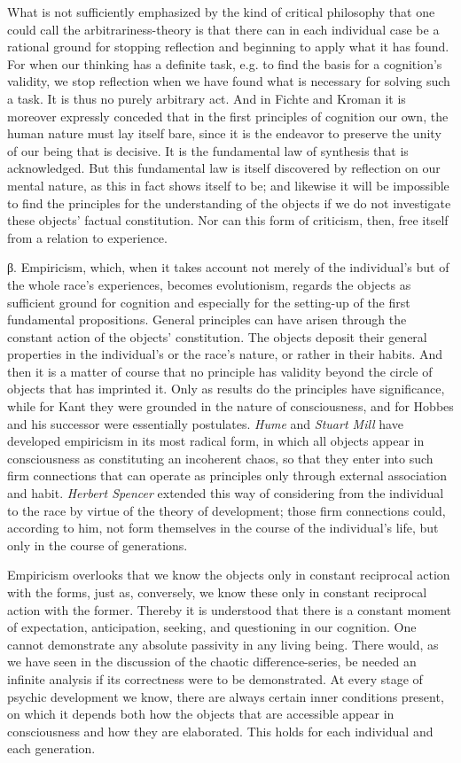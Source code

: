 \documentclass[12pt,a4paper]{book}
\newcommand{\opage}[1]{\marginnote{\footnotesize\textit{[#1]}}}
\begin{document}
What is not sufficiently emphasized by the kind of critical philosophy that one
could call the arbitrariness-theory is that there can in each individual case
be a rational ground for stopping reflection and beginning to apply what it has
found. For when our thinking has a definite task, e.g. to find the basis for a
cognition's validity, we stop reflection when we have found what is necessary
for solving such a task. It is thus no purely arbitrary act. And in Fichte and
Kroman it is moreover expressly conceded that in the first principles of
cognition our own, the human nature must lay itself bare, since it is the
endeavor to preserve the unity of our being that is decisive. It is the
fundamental law of synthesis that is acknowledged. But this fundamental law is
itself discovered by reflection on our mental nature, as this in fact shows
itself to be; and likewise it will be impossible to find the principles for the
understanding of the objects if we do not investigate these objects' \opage{269}factual
constitution. Nor can this form of criticism, then, free itself from a relation
to experience.

β. Empiricism, which, when it takes account not merely of the individual's but
of the whole race's experiences, becomes evolutionism, regards the objects as
sufficient ground for cognition and especially for the setting-up of the first
fundamental propositions. General principles can have arisen through the
constant action of the objects' constitution. The objects deposit their general
properties in the individual's or the race's nature, or rather in their habits.
And then it is a matter of course that no principle has validity beyond the
circle of objects that has imprinted it. Only as results do the principles have
significance, while for Kant they were grounded in the nature of consciousness,
and for Hobbes and his successor were essentially postulates. \emph{Hume} and
\emph{Stuart Mill} have developed empiricism in its most radical form, in which
all objects appear in consciousness as constituting an incoherent chaos, so
that they enter into such firm connections that can operate as principles only
through external association and habit. \emph{Herbert Spencer} extended this way
of considering from the individual to the race by virtue of the theory of
development; those firm connections could, according to him, not form themselves
in the course of the individual's life, but only in the course of generations.

Empiricism overlooks that we know the objects only in constant reciprocal
action with the forms, just as, conversely, we know these only in constant
reciprocal action with the former. Thereby it is understood that there is a
constant moment of expectation, anticipation, seeking, and questioning in our
cognition. One cannot demonstrate any absolute passivity in any living being.
There would, as we have seen in the discussion of the chaotic
difference-series, be needed an infinite analysis if its correctness were to be
demonstrated. At every stage of psychic development we know, there are always
certain inner conditions present, on which it depends both how the objects that
are accessible appear in consciousness and how they are elaborated. This holds
for each individual and each generation.
\end{document}
